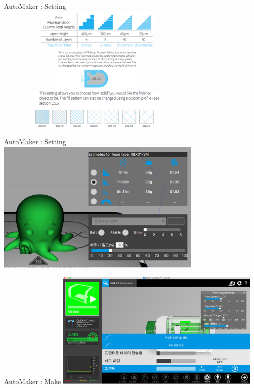 \documentclass[11pt]{beamer}
\begin{document}
\begin{frame}[t]{AutoMaker : Setting}\footnotesize
\centering
\includegraphics[width=10cm, height=2cm]{./image/17_07.png}\\
\includegraphics[width=10cm, height=2cm]{./image/17_06.png}\\
\includegraphics[width=10cm, height=2cm]{./image/17_05.png}
\end{frame}

\begin{frame}[t]{AutoMaker : Setting}\footnotesize
\centering
\includegraphics[width=10cm]{./image/17_23.png}
\end{frame}

\begin{frame}[t]{AutoMaker : Make}\footnotesize
\centering
\includegraphics[width=10cm]{./image/17_24.png}
\end{frame}
\end{document}
